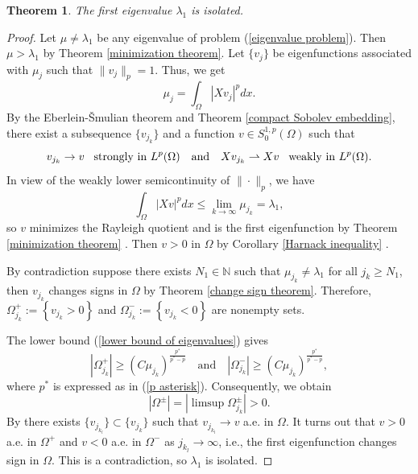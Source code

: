 \documentclass[a4paper,12pt,reqno]{amsart}
\renewcommand\eqref[1]{(\ref{#1})} %
\numberwithin{equation}{section}
\theoremstyle{plain}
\newtheorem{thm}{Theorem}[section]
\theoremstyle{definition}
\begin{document}
\begin{thm}\label{isolated theorem}
The first eigenvalue $\lambda_{1}$ is isolated.
\end{thm}
\begin{proof}
Let $\mu\neq \lambda_{1}$ be any eigenvalue of problem \eqref{eigenvalue problem}. Then $\mu > \lambda_{1}$ by Theorem \ref{minimization theorem}. Let $\{v_{j}\}$ be  eigenfunctions associated with $\mu_{j}$ such that $\|v_{j}\|_{p}=1$. Thus, we get
\begin{equation*}
\mu_{j}=\int_{\Omega}|Xv_{j}|^{p}dx. 
\end{equation*}
By the Eberlein-Šmulian theorem and Theorem \ref{compact Sobolev embedding}, there exist a subsequence $\{v_{j_{k}}\}$ and a function $v\in S_{0}^{1,p}(\Omega)$ such that
\begin{equation*}
v_{j_{k}} \to v\enskip \text{ strongly in } L^{p}(\Omega)\quad \text{and} \quad X v_{j_{k}} \rightharpoonup  X v \enskip \text{ weakly in } L^{p}(\Omega). 
\end{equation*}
In view of the weakly lower semicontinuity of $\|\cdot\|_{p}$, we have
\begin{equation*}
\int_{\Omega}|Xv|^{p}dx \leq \lim_{k\to\infty}\mu_{j_{k}} =\lambda_{1}, 
\end{equation*}
so $v$ minimizes the Rayleigh quotient and is the first eigenfunction by Theorem \ref{minimization theorem} . Then $v>0$ in $\Omega$ by Corollary \ref{Harnack inequality} .

By contradiction suppose there exists $N_{1}\in\mathbb{N}$ such that $\mu_{j_{k}} \neq \lambda_{1}$ for all $j_{k}\geq N_{1}$, then $v_{j_{k}}$ changes signs in $\Omega$ by Theorem \ref{change sign theorem}. Therefore, $\Omega_{j_{k}}^{+}:=\left\{v_{j_{k}}>0\right\}$ and $\Omega_{j_{k}}^{-}:=\left\{v_{j_{k}}<0\right\}$ are nonempty sets.

The lower bound \eqref{lower bound of eigenvalues} gives
$$
\left|\Omega_{j_{k}}^{+}\right| \geq \left(C\mu_{j_{k}}\right)^{\frac{p^{*}}{p^{*}-p}}\quad \text{and} \quad\left|\Omega_{j_{k}}^{-}\right| \geq \left(C\mu_{j_{k}}\right)^{\frac{p^{*}}{p^{*}-p}},$$
where $p^{*}$ is expressed as in \eqref{p asterisk}.  Consequently, we obtain
$$\left|\Omega^{\pm}\right|=\left|\limsup\Omega_{j_{k}}^{\pm}\right|> 0.$$ 
By \cite[Theorem 4.9]{Bre2011}  there exists $\{v_{j_{k_{l}}}\}\subset \{v_{j_{k}}\}$ such that $v_{j_{k_{l}}}\to v$ a.e. in $\Omega$. It turns out that $v>0$ a.e. in $\Omega^{+}$ and $v<0$ a.e. in $\Omega^{-}$ as $j_{k_{l}}\to \infty$, i.e., the first eigenfunction changes sign in $\Omega$. This is a contradiction, so $\lambda_{1}$ is isolated.
\end{proof}
\end{document}
